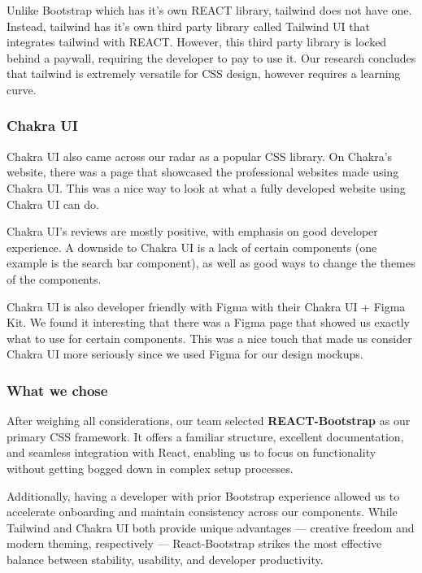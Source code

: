 \documentclass[12pt]{article}
\begin{document}
Unlike Bootstrap which has it's own REACT library, tailwind does not have one.
Instead, tailwind has it's own third party library called Tailwind UI that integrates tailwind with REACT.
However, this third party library is locked behind a paywall, requiring the developer to pay to use it.
Our research concludes that tailwind is extremely versatile for CSS design, however requires a learning curve.

\subsubsection{Chakra UI}
Chakra UI also came across our radar as a popular CSS library.
On Chakra's website, there was a page that showcased the professional websites made using Chakra UI.
This was a nice way to look at what a fully developed website using Chakra UI can do.

Chakra UI's reviews are mostly positive, with emphasis on good developer experience.
A downside to Chakra UI is a lack of certain components (one example is the search bar component), as well
as good ways to change the themes of the components.

Chakra UI is also developer friendly with Figma with their Chakra UI + Figma Kit.
We found it interesting that there was a Figma page that showed us exactly what to use for certain components.
This was a nice touch that made us consider Chakra UI more seriously since we used Figma for our design mockups.

\subsubsection{What we chose}
After weighing all considerations, our team selected \textbf{REACT-Bootstrap} as our primary CSS framework.
It offers a familiar structure, excellent documentation, and seamless integration with React,
enabling us to focus on functionality without getting bogged down in complex setup processes.

Additionally, having a developer with prior Bootstrap experience allowed us to accelerate onboarding
and maintain consistency across our components.
While Tailwind and Chakra UI both provide unique advantages — creative freedom and modern theming,
respectively — React-Bootstrap strikes the most effective balance between stability, usability, and developer productivity.
\end{document}
